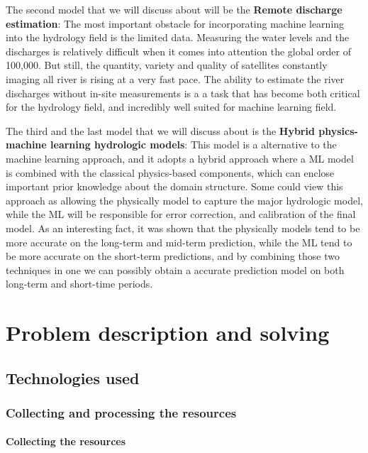 \documentclass[12pt, a4paper]{report}
\begin{document}
The second model that we will discuss about will be the \textbf{Remote discharge estimation}: The most important obstacle for incorporating machine learning into the hydrology field is the limited data. Measuring the water levels and the discharges is relatively difficult when it comes into attention the global order of 100,000. But still, the quantity, variety and quality of satellites constantly imaging all river is rising at a very fast pace. The ability to estimate the river discharges without in-site measurements is a a task that has become both critical for the hydrology field, and incredibly well suited for machine learning field.
\par 

The third and the last model that we will discuss about is the \textbf{Hybrid physics-machine learning hydrologic models}: This model is a alternative to the machine learning approach, and it adopts a hybrid approach where a ML model is combined with the classical physics-based components, which can enclose important prior knowledge about the domain structure. Some could view this approach as allowing the physically model to capture the major hydrologic  model, while the ML will be responsible for error correction, and calibration of the final model. As an interesting fact, it was shown that the physically models tend to be more accurate on the long-term and mid-term prediction, while the ML tend to be more accurate on the short-term predictions, and by combining those two techniques in one we can possibly obtain a accurate prediction model on both long-term and short-time periods.



\newpage{}


\chapter{Problem description and solving}

\section{Technologies used}

\subsection{Collecting and processing the resources}

\subsubsection{Collecting the resources}
\end{document}
